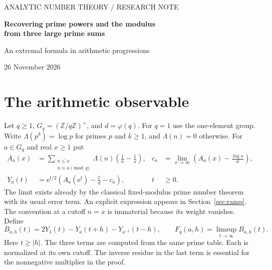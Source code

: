 \documentclass[11pt]{article}
\newcommand{\Z}{\mathbb Z}
\newcommand{\e}{\mathrm e}
\begin{document}
\begin{center}
{\small\sffamily\color{ink} ANALYTIC NUMBER THEORY \quad / \quad RESEARCH NOTE}\par\vspace{11pt}
{\LARGE\bfseries Recovering prime powers and the modulus\\[4pt] from three large prime sums}\par\vspace{9pt}
{\large An extremal formula in arithmetic progressions}\par\vspace{7pt}
{\small 26 November 2026}
\end{center}
\begin{abstract}
Fix a modulus and take weighted prime counts at three cutoffs, $x$, $x\e^h$ and $x\e^{-h}$. We prove that the upper limit of their centered, square-root-normalized second difference, regarded as a function of $h>0$, has a slope jump at each detectable $h=\log p^k$. Its size recovers $\log p/\sqrt{p^k}$ and its location among the reduced residue classes obeys an explicit splitting law at primes dividing the modulus. The same profile is obtained with $x$ restricted to powers of two, even after any fixed initial segment of the prime data has been erased and the counts recentered. The square root of this profile defines a metric that determines the modulus up to the equivalence of an odd modulus and its double. Conversely, without invoking GRH, the growth exponent of the same statistic at any two distinct positive lags determines the supremum of the real parts of zeros.
\end{abstract}
\section{The arithmetic observable}
Let $q\ge1$, $G_q=(\Z/q\Z)^\times$, and $d=\varphi(q)$. For $q=1$ use the one-element group. Write $\Lambda(p^k)=\log p$ for primes $p$ and $k\ge1$, and $\Lambda(n)=0$ otherwise. For $a\in G_q$ and real $x\ge1$ put
\begin{align}
 A_a(x)&=\sum_{\substack{n\le x\\ n\equiv a\pmod q}}\Lambda(n)\left(\frac1n-\frac1x\right),
 &c_a&=\lim_{x\to\infty}\left(A_a(x)-\frac{\log x}{d}\right),\label{eq:obs}\\
 Y_a(t)&=\e^{t/2}\left(A_a(\e^t)-\frac{t}{d}-c_a\right),
 &t&\ge0.\nonumber
\end{align}
The limit exists already by the classical fixed-modulus prime number theorem with its usual error term. An explicit expression appears in Section~\ref{sec:ramp}. The convention at a cutoff $n=x$ is immaterial because its weight vanishes. Define
\begin{equation}
 B_{a,h}(t)=2Y_1(t)-Y_a(t+h)-Y_{a^{-1}}(t-h),\qquad
 F_q(a,h)=\limsup_{t\to\infty} B_{a,h}(t).                 \label{eq:B}
\end{equation}
Here $t\ge |h|$. The three terms are computed from the same prime table. Each is normalized at its own cutoff. The inverse residue in the last term is essential for the nonnegative multiplier in the proof.
\end{document}
